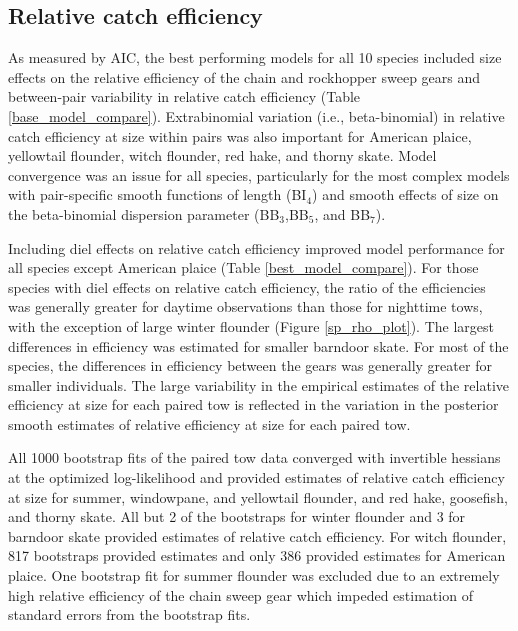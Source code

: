 \documentclass[
  12pt,
]{article}
\begin{document}
\hypertarget{relative-catch-efficiency}{%
\subsection{Relative catch efficiency}\label{relative-catch-efficiency}}

As measured by AIC, the best performing models for all 10 species
included size effects on the relative efficiency of the chain and
rockhopper sweep gears and between-pair variability in relative catch
efficiency (Table \ref{base_model_compare}). Extrabinomial variation
(i.e., beta-binomial) in relative catch efficiency at size within pairs
was also important for American plaice, yellowtail flounder, witch
flounder, red hake, and thorny skate. Model convergence was an issue for
all species, particularly for the most complex models with pair-specific
smooth functions of length (BI\(_4\)) and smooth effects of size on the
beta-binomial dispersion parameter (BB\(_3\),BB\(_5\), and BB\(_7\)).

Including diel effects on relative catch efficiency improved model
performance for all species except American plaice (Table
\ref{best_model_compare}). For those species with diel effects on
relative catch efficiency, the ratio of the efficiencies was generally
greater for daytime observations than those for nighttime tows, with the
exception of large winter flounder (Figure \ref{sp_rho_plot}). The
largest differences in efficiency was estimated for smaller barndoor
skate. For most of the species, the differences in efficiency between
the gears was generally greater for smaller individuals. The large
variability in the empirical estimates of the relative efficiency at
size for each paired tow is reflected in the variation in the posterior
smooth estimates of relative efficiency at size for each paired tow.

All 1000 bootstrap fits of the paired tow data converged with invertible
hessians at the optimized log-likelihood and provided estimates of
relative catch efficiency at size for summer, windowpane, and yellowtail
flounder, and red hake, goosefish, and thorny skate. All but 2 of the
bootstraps for winter flounder and 3 for barndoor skate provided
estimates of relative catch efficiency. For witch flounder, 817
bootstraps provided estimates and only 386 provided estimates for
American plaice. One bootstrap fit for summer flounder was excluded due
to an extremely high relative efficiency of the chain sweep gear which
impeded estimation of standard errors from the bootstrap fits.
\end{document}
